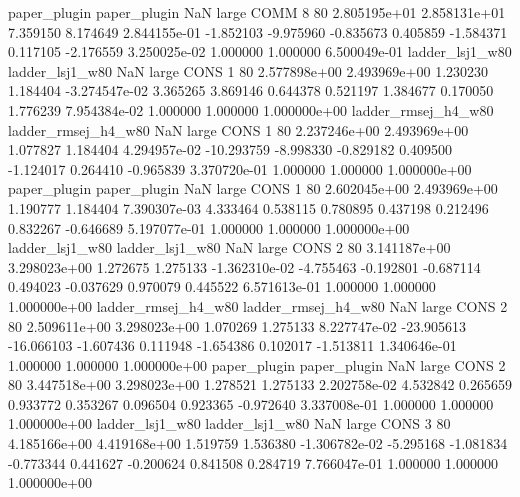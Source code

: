        paper_plugin        paper_plugin                   NaN      large     COMM                 8 80 2.805195e+01   2.858131e+01      7.359150       8.174649  2.844155e-01     -1.852103     -9.975960    -0.835673       0.405859 -1.584371   0.117105    -2.176559   3.250025e-02            1.000000        1.000000        6.500049e-01
    ladder_lsj1_w80     ladder_lsj1_w80                   NaN      large     CONS                 1 80 2.577898e+00   2.493969e+00      1.230230       1.184404 -3.274547e-02      3.365265      3.869146     0.644378       0.521197  1.384677   0.170050     1.776239   7.954384e-02            1.000000        1.000000        1.000000e+00
ladder_rmsej_h4_w80 ladder_rmsej_h4_w80                   NaN      large     CONS                 1 80 2.237246e+00   2.493969e+00      1.077827       1.184404  4.294957e-02    -10.293759     -8.998330    -0.829182       0.409500 -1.124017   0.264410    -0.965839   3.370720e-01            1.000000        1.000000        1.000000e+00
       paper_plugin        paper_plugin                   NaN      large     CONS                 1 80 2.602045e+00   2.493969e+00      1.190777       1.184404  7.390307e-03      4.333464      0.538115     0.780895       0.437198  0.212496   0.832267    -0.646689   5.197077e-01            1.000000        1.000000        1.000000e+00
    ladder_lsj1_w80     ladder_lsj1_w80                   NaN      large     CONS                 2 80 3.141187e+00   3.298023e+00      1.272675       1.275133 -1.362310e-02     -4.755463     -0.192801    -0.687114       0.494023 -0.037629   0.970079     0.445522   6.571613e-01            1.000000        1.000000        1.000000e+00
ladder_rmsej_h4_w80 ladder_rmsej_h4_w80                   NaN      large     CONS                 2 80 2.509611e+00   3.298023e+00      1.070269       1.275133  8.227747e-02    -23.905613    -16.066103    -1.607436       0.111948 -1.654386   0.102017    -1.513811   1.340646e-01            1.000000        1.000000        1.000000e+00
       paper_plugin        paper_plugin                   NaN      large     CONS                 2 80 3.447518e+00   3.298023e+00      1.278521       1.275133  2.202758e-02      4.532842      0.265659     0.933772       0.353267  0.096504   0.923365    -0.972640   3.337008e-01            1.000000        1.000000        1.000000e+00
    ladder_lsj1_w80     ladder_lsj1_w80                   NaN      large     CONS                 3 80 4.185166e+00   4.419168e+00      1.519759       1.536380 -1.306782e-02     -5.295168     -1.081834    -0.773344       0.441627 -0.200624   0.841508     0.284719   7.766047e-01            1.000000        1.000000        1.000000e+00
